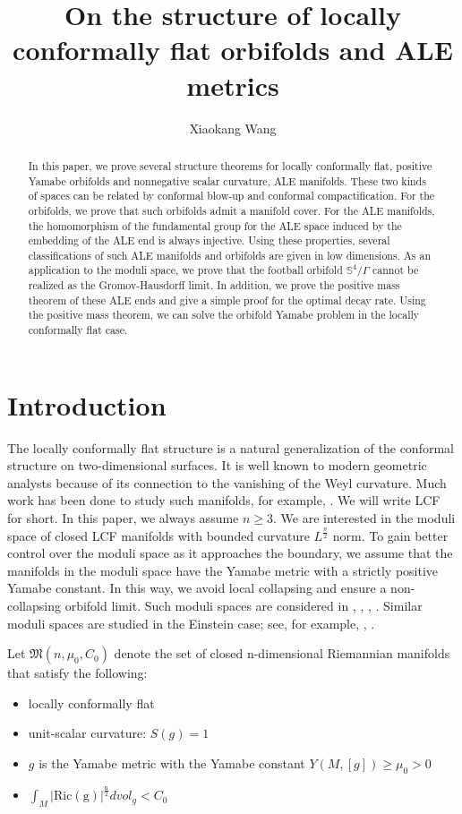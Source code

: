 \documentclass[12pt]{amsart}
\title{On the structure of locally conformally flat orbifolds and ALE metrics}
\author{Xiaokang Wang}
\theoremstyle{definition}
\begin{document}
\begin{abstract}
In this paper, we prove several structure theorems for locally conformally flat, positive Yamabe orbifolds and nonnegative scalar curvature, ALE manifolds. These two kinds of spaces can be related by conformal blow-up and conformal compactification. For the orbifolds, we prove that such orbifolds admit a manifold cover. For the ALE manifolds, the homomorphism of the fundamental group for the ALE space induced by the embedding of the ALE end is always injective.  Using these properties, several classifications of such ALE manifolds and orbifolds are given in low dimensions. As an application to the moduli space, we prove that the football orbifold $\mathbb{S}^4/\Gamma$ cannot be realized as the Gromov-Hausdorff limit. In addition, we prove the positive mass theorem of these ALE ends and give a simple proof for the optimal decay rate. Using the positive mass theorem, we can solve the orbifold Yamabe problem in the locally conformally flat case. 
    
\end{abstract}
\maketitle
\section{Introduction}
The locally conformally flat structure is a natural generalization of the conformal structure on two-dimensional surfaces. It is well known to modern geometric analysts because of its connection to the vanishing of the Weyl curvature. Much work has been done to study such manifolds, for example, \cite{SYconformal}. We will write LCF for short. In this paper, we always assume $n\geq 3$. We are interested in the moduli space of closed LCF manifolds with bounded curvature $L^{\frac{n}{2}}$ norm. To gain better control over the moduli space as it approaches the boundary, we assume that the manifolds in the moduli space have the Yamabe metric with a strictly positive Yamabe constant. In this way, we avoid local collapsing and ensure a non-collapsing orbifold limit. Such moduli spaces are considered in \cite{Aku}, \cite{TV1}, \cite{TV2}, \cite{TV3}. Similar moduli spaces are studied in the Einstein case; see, for example, \cite{And89}, \cite{BKN}.

Let $\mathfrak{M}(n, \mu_0, C_0)$ denote the set of closed n-dimensional Riemannian manifolds that satisfy the following:
\begin{itemize}
    \item locally conformally flat
    \item unit-scalar curvature:  $S(g)=1$
    \item $g$ is the Yamabe metric with the Yamabe constant $Y(M,[g])\geq \mu_0 >0$
    \item $\int_M |\operatorname{Ric(g)|^{\frac{n}{2}}}dvol_g < C_0$
\end{itemize}
\end{document}
